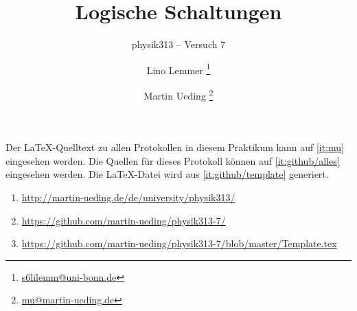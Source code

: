


\usepackage{placeins}


\subject{Praktikumsprotokoll}
\title{Logische Schaltungen}
\subtitle{physik313 – Versuch 7}
\author{
	Lino Lemmer
    \footnote{\href{mailto:s6lilemm@uni-bonn.de}{s6lilemm@uni-bonn.de}}
	\and
	Martin Ueding
    \footnote{\href{mailto:mu@martin-ueding.de}{mu@martin-ueding.de}}
}


\newcommand\fT{f_\text{T}}
\newcommand\IB{I_\text{B}}
\newcommand\IC{I_\text{C}}
\newcommand\ID{I_\text{D}}
\newcommand\IE{I_\text{E}}
\newcommand\IS{I_\text{S}}
\newcommand\RC{R_\text{C}}
\newcommand\RD{R_\text{D}}
\newcommand\RE{R_\text{E}}
\newcommand\UBE{U_\text{BE}}
\newcommand\UB{U_\text{B}}
\newcommand\UCE{U_\text{CE}}
\newcommand\UC{U_\text{C}}
\newcommand\UD{U_\text{D}}
\newcommand\UDS{U_\text{DS}}
\newcommand\UE{U_\text{E}}
\newcommand\UGS{U_\text{GS}}
\newcommand\UG{U_\text{G}}
\newcommand\Uin{U_\text{in}}
\newcommand\Uout{U_\text{out}}

\newcommand\UEH{U_\text{E H}}
\newcommand\UEL{U_\text{E L}}
\newcommand\UH{U_\text{H}}
\newcommand\UL{U_\text{L}}
\newcommand\UQH{U_\text{Q H}}
\newcommand\UQL{U_\text{Q L}}

\newcommand\mand {\wedge}
\newcommand\mhigh{\top}
\newcommand\mlow {\bot}
\newcommand\mnand{\bar\wedge}
\newcommand\mnor {\bar\vee}
\newcommand\mnot {\neg}
\newcommand\mor  {\vee}
\newcommand\mxor {\veebar}
\newcommand\tand {\textsc{and}}
\newcommand\thigh{\textsc{high}}
\newcommand\tlow {\textsc{low}}
\newcommand\tnand{\textsc{nand}}
\newcommand\tnor {\textsc{nor}}
\newcommand\tnot {\textsc{not}}
\newcommand\tor  {\textsc{or}}
\newcommand\txor {\textsc{xor}}



\maketitle

Der \LaTeX-Quelltext zu allen Protokollen in diesem Praktikum kann auf
\ref{it:mu} eingesehen werden. Die Quellen für dieses Protokoll können auf
\ref{it:github/alles} eingesehen werden. Die \LaTeX-Datei wird aus
\ref{it:github/template} generiert.

\begin{enumerate}
	\item
		\label{it:mu}
		\url{http://martin-ueding.de/de/university/physik313/}
	\item
		\label{it:github/alles}
		\url{https://github.com/martin-ueding/physik313-7/}
	\item
		\label{it:github/template}
		\url{https://github.com/martin-ueding/physik313-7/blob/master/Template.tex}
\end{enumerate}

